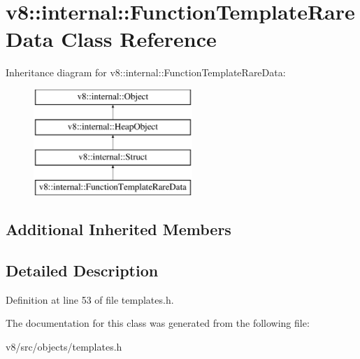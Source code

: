 \hypertarget{classv8_1_1internal_1_1FunctionTemplateRareData}{}\section{v8\+:\+:internal\+:\+:Function\+Template\+Rare\+Data Class Reference}
\label{classv8_1_1internal_1_1FunctionTemplateRareData}
Inheritance diagram for v8\+:\+:internal\+:\+:Function\+Template\+Rare\+Data\+:\begin{figure}[H]
\begin{center}
\leavevmode
\includegraphics[height=4.000000cm]{classv8_1_1internal_1_1FunctionTemplateRareData}
\end{center}
\end{figure}
\subsection*{Additional Inherited Members}


\subsection{Detailed Description}


Definition at line 53 of file templates.\+h.



The documentation for this class was generated from the following file\+:\begin{DoxyCompactItemize}
\item 
v8/src/objects/templates.\+h\end{DoxyCompactItemize}
